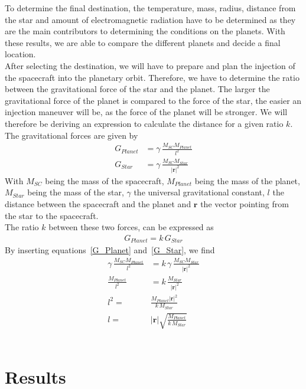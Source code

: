 \documentclass[reprint,english,notitlepage]{revtex4-2}
\begin{document}
To determine the final destination, the temperature, mass, radius, distance from the star and amount of electromagnetic radiation have to be determined as they are the main contributors to determining the conditions on the planets.
With these results, we are able to compare the different planets and decide a final location.\\

After selecting the destination, we will have to prepare and plan the injection of the spacecraft into the planetary orbit.
Therefore, we have to determine the ratio between the gravitational force of the star and the planet.
The larger the gravitational force of the planet is compared to the force of the star, the easier an injection maneuver will be, as the force of the planet will be stronger.
We will therefore be deriving an expression to calculate the distance for a given ratio $k$.
The gravitational forces are given by
\begin{align}
    G_{Planet} &= \gamma \, \frac{M_{SC}M_{Planet}}{l^2} \label{G_Planet}\\
	G_{Star} &= \gamma \, \frac{M_{SC}M_{Star}}{|\textbf{r}|^2} \label{G_Star}
\end{align}
With $M_{SC}$ being the mass of the spacecraft, $M_{Planet}$ being the mass of the planet, $M_{Star}$ being the mass of the star, $\gamma$ the universal gravitational constant, $l$ the distance between the spacecraft and the planet and $\textbf{r}$ the vector pointing from the star to the spacecraft.\\
The ratio $k$ between these two forces, can be expressed as
\begin{align*}
    G_{Planet} = k\, G_{Star}
\end{align*}
By inserting equations~\eqref{G_Planet} and~\eqref{G_Star}, we find
\begin{align*}
    \gamma \, \frac{M_{SC}M_{Planet}}{l^2} &= k\, \gamma \, \frac{M_{SC}M_{Star}}{|\textbf{r}|^2}\\
	\frac{M_{Planet}}{l^2} &= k\, \frac{M_{Star}}{|\textbf{r}|^2}\\
	l^2 =& \frac{M_{Planet}|\textbf{r}|^2}{k\,M_{Star}}\\
	l =& |\textbf{r}|\sqrt{\frac{M_{Planet}}{k\,M_{Star}}}
\end{align*}\\


\section{Results} \label{sec:results}
\end{document}
